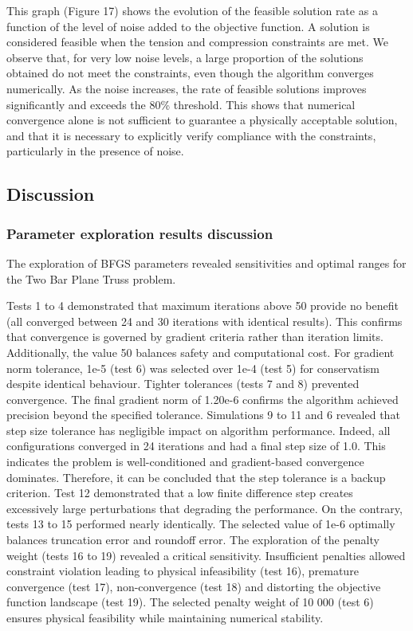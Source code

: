 This graph (Figure 17) shows the evolution of the feasible solution rate as a function of the level of noise added to the objective function. A solution is considered feasible when the tension and compression constraints are met. We observe that, for very low noise levels, a large proportion of the solutions obtained do not meet the constraints, even though the algorithm converges numerically. As the noise increases, the rate of feasible solutions improves significantly and exceeds the 80\% threshold. This shows that numerical convergence alone is not sufficient to guarantee a physically acceptable solution, and that it is necessary to explicitly verify compliance with the constraints, particularly in the presence of noise.

\subsection{Discussion}
\subsubsection{Parameter exploration results discussion}
The exploration of BFGS parameters revealed sensitivities and optimal ranges for the Two Bar Plane Truss problem. 

Tests 1 to 4 demonstrated that maximum iterations above 50 provide no benefit (all converged between 24 and 30 iterations with identical results). This confirms that convergence is governed by gradient criteria rather than iteration limits. Additionally, the value 50 balances safety and computational cost.
For gradient norm tolerance, 1e-5 (test 6) was selected over 1e-4 (test 5) for conservatism despite identical behaviour. Tighter tolerances (tests 7 and 8) prevented convergence. The final gradient norm of 1.20e-6 confirms the algorithm achieved precision beyond the specified tolerance.
Simulations 9 to 11 and 6 revealed that step size tolerance has negligible impact on algorithm performance. Indeed, all configurations converged in 24 iterations and had a final step size of 1.0. This indicates the problem is well-conditioned and gradient-based convergence dominates. Therefore, it can be concluded that the step tolerance is a backup criterion.
Test 12 demonstrated that a low finite difference step creates excessively large perturbations that degrading the performance. On the contrary, tests 13 to 15 performed nearly identically. The selected value of 1e-6 optimally balances truncation error and roundoff error.
The exploration of the penalty weight (tests 16 to 19) revealed a critical sensitivity. Insufficient penalties allowed constraint violation leading to physical infeasibility (test 16), premature convergence (test 17), non-convergence (test 18) and distorting the objective function landscape (test 19). The selected penalty weight of 10 000 (test 6) ensures physical feasibility while maintaining numerical stability.

